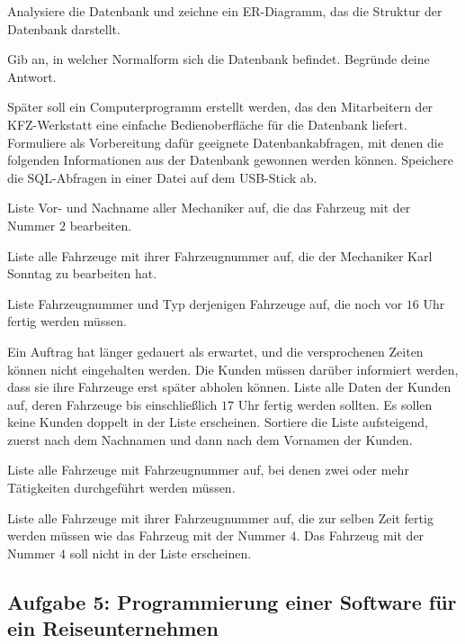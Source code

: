 \begin{compactenum}[a)]
\item Analysiere die Datenbank und zeichne ein ER-Diagramm, das die Struktur der
Datenbank darstellt.
\item Gib an, in welcher Normalform sich die Datenbank 
befindet. Begründe deine Antwort.
\item Später soll ein Computerprogramm erstellt werden, das den Mitarbeitern der
KFZ-Werkstatt eine einfache Bedienoberfläche für die Datenbank liefert.
Formuliere als Vorbereitung dafür geeignete Datenbankabfragen, mit denen die
folgenden Informationen aus der Datenbank  gewonnen
werden können. Speichere die SQL-Abfragen in einer Datei auf dem USB-Stick ab.

\begin{compactenum}[1.]
\item Liste Vor- und Nachname aller Mechaniker auf, die das Fahrzeug mit der
Nummer $2$ bearbeiten.
\item Liste alle Fahrzeuge mit ihrer Fahrzeugnummer auf, die der Mechaniker
Karl Sonntag zu bearbeiten hat.
\item Liste Fahrzeugnummer und Typ derjenigen Fahrzeuge auf, die noch vor $16$
Uhr fertig werden müssen.
\item Ein Auftrag hat länger gedauert als erwartet, und die versprochenen Zeiten
können nicht eingehalten werden. Die Kunden müssen darüber informiert werden,
dass sie ihre Fahrzeuge erst später abholen können. Liste alle Daten der Kunden
auf, deren Fahrzeuge bis einschließlich $17$ Uhr fertig werden sollten. Es sollen
keine Kunden doppelt in der Liste erscheinen. Sortiere die Liste aufsteigend,
zuerst nach dem Nachnamen und dann nach dem Vornamen der Kunden.
\item Liste alle Fahrzeuge mit Fahrzeugnummer auf, bei denen zwei oder mehr
Tätigkeiten durchgeführt werden müssen.
\item Liste alle Fahrzeuge mit ihrer Fahrzeugnummer auf, die zur selben Zeit
fertig werden müssen wie das Fahrzeug mit der Nummer $4$. Das Fahrzeug mit der
Nummer $4$ soll nicht in der Liste erscheinen.
\end{compactenum}
\end{compactenum}


\subsection{Aufgabe 5: Programmierung einer Software für ein Reiseunternehmen}

